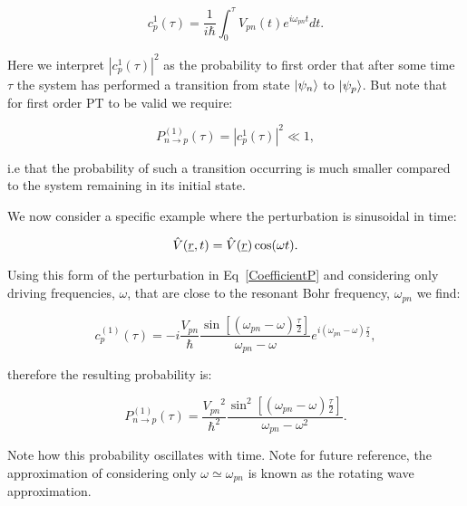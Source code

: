 \begin{equation}
    c^{1}_p(\tau) = \frac{1}{i \hbar} \int_0^\tau V_{pn}(t)e^{i\omega_{pn}t} dt.
    \label{CoefficientP}
\end{equation}

\noindent Here we interpret $|c^{1}_p(\tau)|^2$ as the probability to first order that after some time $\tau$ the system has performed a transition from state $\ket{\psi_n}$ to $\ket{\psi_p}$. But note that for first order PT to be valid we require:

\begin{equation}
    P^{(1)}_{n \rightarrow p}(\tau) = |c^{1}_p(\tau)|^2 \ll 1,
    \label{ConditionFirstOrderPT}
\end{equation}

\noindent i.e that the probability of such a transition occurring is much smaller compared to the system remaining in its initial state.

\noindent We now consider a specific example where the perturbation is sinusoidal in time:

\begin{equation}
    \Hat{V}(\underline{r}, t) = \Hat{V}(\underline{r}) \cos(\omega t)
    \label{SinusoidalPerturbation}.
\end{equation}

Using this form of the perturbation in Eq~\ref{CoefficientP} and considering only driving frequencies, $\omega$, that are close to the resonant Bohr frequency, $\omega_{pn}$ we find:

\begin{equation}
    c^{(1)}_p(\tau) = -i \frac{V_{pn}}{\hbar} \frac{\sin[(\omega_{pn} - \omega)\frac{\tau}{2}]}{\omega_{pn} - \omega} e^{i(\omega_{pn} - \omega) \frac{\tau}{2}},
    \label{SinusoidalPerturbationCoefficient}
\end{equation}

\noindent therefore the resulting probability is:

\begin{equation}
    P^{(1)}_{n \rightarrow p}(\tau) = \frac{{V_{pn}}^2}{\hbar^2} \frac{\sin^2[(\omega_{pn} - \omega)\frac{\tau}{2}]}{{\omega_{pn} - \omega}^2}
    \label{SinusoidalPerturbationProbability}.
\end{equation}

\noindent Note how this probability oscillates with time. Note for future reference, the approximation of considering only $\omega \simeq \omega_{pn}$ is known as the rotating wave approximation.

